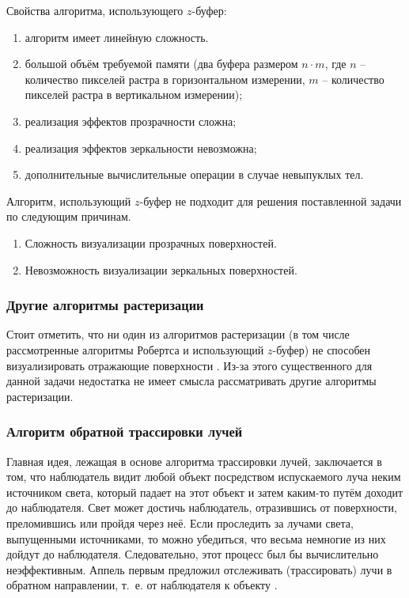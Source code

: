 Свойства алгоритма, использующего $z$-буфер:
\begin{enumerate}[label=\arabic*)]
	\item алгоритм имеет линейную сложность.
	\item большой объём требуемой памяти (два буфера размером $n \cdot m$, где $n$ -- количество пикселей растра в горизонтальном измерении, $m$ -- количество пикселей растра в вертикальном измерении);
	\item реализация эффектов прозрачности сложна;
	\item реализация эффектов зеркальности невозможна;
	\item дополнительные вычислительные операции в случае невыпуклых тел.
\end{enumerate}

Алгоритм, использующий $z$-буфер не подходит для решения поставленной задачи по следующим причинам.

\begin{enumerate}[label=\arabic*)]
	\item Сложность визуализации прозрачных поверхностей.
	\item Невозможность визуализации зеркальных поверхностей.
\end{enumerate}

\subsubsection{Другие алгоритмы растеризации}
Стоит отметить, что ни один из алгоритмов растеризации (в том числе рассмотренные алгоритмы Робертса и использующий $z$-буфер) не способен визуализировать отражающие поверхности \cite{rodgers}. Из-за этого существенного для данной задачи недостатка не имеет смысла рассматривать другие алгоритмы растеризации.
\subsubsection{Алгоритм обратной трассировки лучей}

Главная идея, лежащая в основе алгоритма трассировки лучей, заключается в том, что наблюдатель видит любой объект посредством испускаемого луча неким источником света, который падает на этот объект и затем каким-то путём доходит до наблюдателя. Свет может достичь наблюдатель, отразившись от поверхности, преломившись или пройдя через неё. Если проследить за лучами света, выпущенными источниками, то можно убедиться, что весьма немногие из них дойдут до наблюдателя. Следовательно, этот процесс был бы вычислительно неэффективным. Аппель первым предложил отслеживать (трассировать) лучи в обратном направлении, т.~е. от наблюдателя к объекту \cite{rodgers}.

